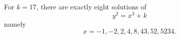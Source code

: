 \begin{proposition}\label{eq:088}
    For $k=17$, there are exactly eight solutions of
\[
    y^2=x^3+k
\]
    namely
\[
    x=-1,-2,2,4,8,43,52,5234.
\]
\end{proposition}
